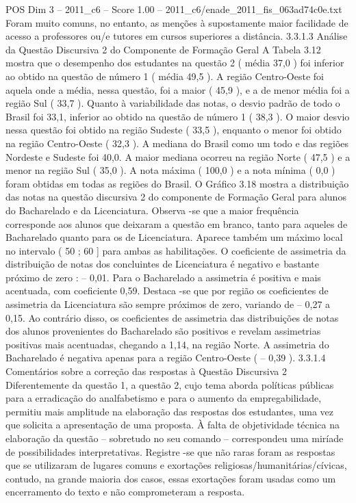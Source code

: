 \begin{textsample}{POS Dim 3 – 2011\_c6 – Score 1.00 – 2011\_c6/enade\_2011\_fis\_063ad74c0e.txt}
Foram muito comuns, no entanto, as menções à supostamente maior facilidade de acesso a professores ou/e tutores em cursos superiores a distância. 3.3.1.3 Análise da Questão Discursiva 2 do Componente de Formação Geral A Tabela 3.12 mostra que o desempenho dos estudantes na questão 2 ( média 37,0 ) foi inferior ao obtido na questão de número 1 ( média 49,5 ).
A região Centro-Oeste foi aquela onde a média, nessa questão, foi a maior ( 45,9 ), e a de menor média foi a região Sul ( 33,7 ).
Quanto à variabilidade das notas, o desvio padrão de todo o Brasil foi 33,1, inferior ao obtido na questão de número 1 ( 38,3 ).
O maior desvio nessa questão foi obtido na região Sudeste ( 33,5 ), enquanto o menor foi obtido na região Centro-Oeste ( 32,3 ).
A mediana do Brasil como um todo e das regiões Nordeste e Sudeste foi 40,0.
A maior mediana ocorreu na região Norte ( 47,5 ) e a menor na região Sul ( 35,0 ).
A nota máxima ( 100,0 ) e a nota mínima ( 0,0 ) foram obtidas em todas as regiões do Brasil.
O Gráfico 3.18 mostra a distribuição das notas na questão discursiva 2 do componente de Formação Geral para alunos do Bacharelado e da Licenciatura.
Observa -se que a maior frequência corresponde aos alunos que deixaram a questão em branco, tanto para aqueles de Bacharelado quanto para os de Licenciatura.
Aparece também um máximo local no intervalo ( 50 ; 60 ] para ambas as habilitações.
O coeficiente de assimetria da distribuição de notas dos concluintes de Licenciatura é negativo e bastante próximo de zero : – 0,01.
Para o Bacharelado a assimetria é positiva e mais acentuada, com coeficiente 0,59.
Destaca -se que por região os coeficientes de assimetria da Licenciatura são sempre próximos de zero, variando de – 0,27 a 0,15.
Ao contrário disso, os coeficientes de assimetria das distribuições de notas dos alunos provenientes do Bacharelado são positivos e revelam assimetrias positivas mais acentuadas, chegando a 1,14, na região Norte.
A assimetria do Bacharelado é negativa apenas para a região Centro-Oeste ( – 0,39 ). 3.3.1.4 Comentários sobre a correção das respostas à Questão Discursiva 2 Diferentemente da questão 1, a questão 2, cujo tema aborda políticas públicas para a erradicação do analfabetismo e para o aumento da empregabilidade, permitiu mais amplitude na elaboração das respostas dos estudantes, uma vez que solicita a apresentação de uma proposta.
À falta de objetividade técnica na elaboração da questão – sobretudo no seu comando – correspondeu uma miríade de possibilidades interpretativas.
Registre -se que não raras foram as respostas que se utilizaram de lugares comuns e exortações religiosas/humanitárias/cívicas, contudo, na grande maioria dos casos, essas exortações foram usadas como um encerramento do texto e não comprometeram a resposta.

\end{textsample}
